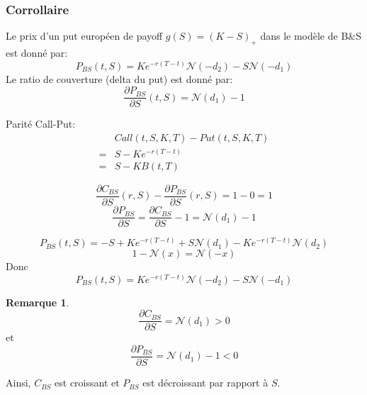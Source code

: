 \documentclass{article}
\theoremstyle{plain}
\theoremstyle{definition}
\newtheorem{remq}[thm]{Remarque}
\begin{document}
\subsubsection{Corrollaire}
Le prix d'un put europ\'een de payoff $g(S)=(K-S)_+$ dans le mod\`ele de B\&S est donn\'e par:
\begin{equation}
P_{BS}(t,S)=Ke^{-r(T-t)}\mathcal{N}(-d_2)-S\mathcal{N}(-d_1)
\end{equation}
Le ratio de couverture (delta du put) est donn\'e par:
\begin{equation}
\frac{\partial P_{BS}}{\partial S}(t,S)=\mathcal{N}(d_1)-1 
\end{equation}

Parit\'e Call-Put:
\begin{equation}
\begin{split}
&Call(t,S,K,T)-Put(t,S,K,T)\\
=& S-Ke^{-r(T-t)}\\
=&S-KB(t,T)
\end{split}
\end{equation}

\begin{equation}
\frac{\partial C_{BS}}{\partial S}(r,S)-\frac{\partial P_{BS}}{\partial S}(r,S) = 1-0=1
\end{equation}
\begin{equation}
\frac{\partial P_{BS}}{\partial S} = \frac{\partial C_{BS}}{\partial S}-1=\mathcal{N}(d_1)-1
\end{equation}

\begin{equation}
P_{BS}(t,S)=-S+Ke^{-r(T-t)}+S\mathcal{N}(d_1)-Ke^{-r(T-t)}\mathcal{N}(d_2)
\end{equation}
\begin{equation}
1-\mathcal{N}(x)=\mathcal{N}(-x)
\end{equation}
Donc 
\begin{equation}
P_{BS}(t,S)=Ke^{-r(T-t)}\mathcal{N}(-d_2)-S\mathcal{N}(-d_1)
\end{equation}
\begin{remq}
	\begin{equation}
\frac{\partial C_{BS}}{\partial S}=\mathcal{N}(d_1)>0
\end{equation}
et
\begin{equation}
\frac{\partial P_{BS}}{\partial S}=\mathcal{N}(d_1)-1<0
\end{equation}
\end{remq}
Ainsi, $C_{BS}$ est croissant et $P_{BS}$ est d\'ecroissant par rapport \`a $S$.
\end{document}
